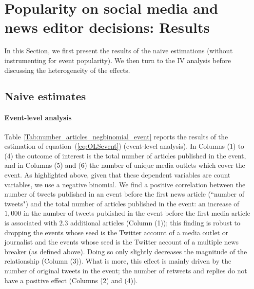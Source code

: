 \section{Popularity on social media and news editor decisions: Results\label{Sec:Results}}

In this Section, we first present the results of the naive estimations (without instrumenting for event popularity). We then turn to the IV analysis before discussing the heterogeneity of the effects.


\subsection{Naive estimates}

\paragraph{Event-level analysis}

Table \ref{Tab:number_articles_negbinomial_event} reports the results of the estimation of equation~(\ref{eq:OLSevent}) (event-level analysis). In Columns (1) to (4) the outcome of interest is the total number of articles published in the event, and in Columns (5) and (6) the number of unique media outlets which cover the event. As highlighted above, given that these dependent variables are count variables, we use a negative binomial. We find a positive correlation between the number of tweets published in an event before the first news article (``number of tweets") and the total number of articles published in the event: an increase of $1,000$ in the number of tweets published in the event before the first media article is associated with $2.3$ additional articles (Column (1)); this finding is robust to dropping the events whose seed is the Twitter account of a media outlet or journalist and the events whose seed is the Twitter account of a multiple news breaker (as defined above). Doing so only slightly decreases the magnitude of the relationship (Column (3)). What is more, this effect is mainly driven by the number of original tweets in the event; the number of retweets and replies do not have a positive effect (Columns (2) and (4)).

